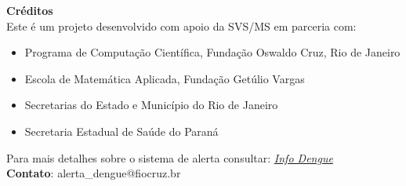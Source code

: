 \documentclass[10pt]{article} %
\begin{document}
\begin{minipage}[t]{1\linewidth}
\textbf{Créditos}\\
Este é um projeto desenvolvido com apoio da SVS/MS em parceria com:
\begin{itemize}
\item Programa de Computação Científica, Fundação Oswaldo Cruz, Rio de Janeiro\\
\item Escola de Matemática Aplicada, Fundação Getúlio Vargas\\
\item Secretarias do Estado e Município do Rio de Janeiro\\
\item Secretaria Estadual de Saúde do Paraná\\
\end{itemize}

Para mais detalhes sobre o sistema de alerta consultar: \href{http://info.dengue.mat.br}{\textit{Info Dengue}}\\

\textbf{Contato}: alerta\_dengue@fiocruz.br
\end{minipage} %
\end{document}
